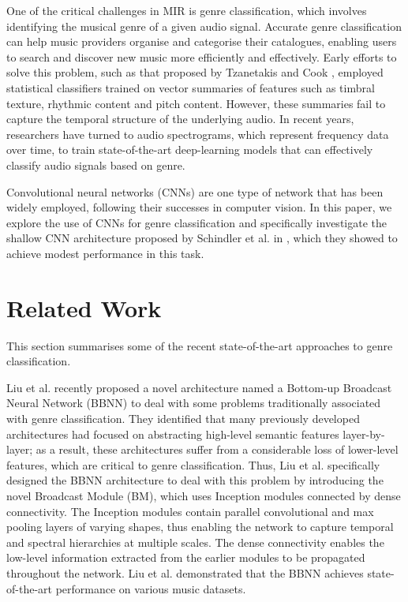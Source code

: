 \documentclass[conference]{IEEEtran}
\begin{document}
One of the critical challenges in MIR is genre classification, which involves identifying the musical genre of a given audio signal.
Accurate genre classification can help music providers organise and categorise their catalogues, enabling users to search and discover new music more efficiently and effectively.
Early efforts to solve this problem, such as that proposed by Tzanetakis and Cook \cite{TzanetakisCook}, employed statistical classifiers trained on vector summaries of features such as timbral texture, rhythmic content and pitch content.
However, these summaries fail to capture the temporal structure of the underlying audio.
In recent years, researchers have turned to audio spectrograms, which represent frequency data over time, to train state-of-the-art deep-learning models that can effectively classify audio signals based on genre.

Convolutional neural networks (CNNs) are one type of network that has been widely employed, following their successes in computer vision.
In this paper, we explore the use of CNNs for genre classification and specifically investigate the shallow CNN architecture proposed by Schindler et al. in \cite{SchindlerLidyRauber}, which they showed to achieve modest performance in this task.

\section{Related Work}

This section summarises some of the recent state-of-the-art approaches to genre classification.

Liu et al. \cite{LiuFengLiuWangLiu} recently proposed a novel architecture named a Bottom-up Broadcast Neural Network (BBNN) to deal with some problems traditionally associated with genre classification.
They identified that many previously developed architectures had focused on abstracting high-level semantic features layer-by-layer; as a result, these architectures suffer from a considerable loss of lower-level features, which are critical to genre classification.
Thus, Liu et al. specifically designed the BBNN architecture to deal with this problem by introducing the novel Broadcast Module (BM), which uses Inception modules connected by dense connectivity.
The Inception modules contain parallel convolutional and max pooling layers of varying shapes, thus enabling the network to capture temporal and spectral hierarchies at multiple scales.
The dense connectivity enables the low-level information extracted from the earlier modules to be propagated throughout the network.
Liu et al. demonstrated that the BBNN achieves state-of-the-art performance on various music datasets.
\end{document}

